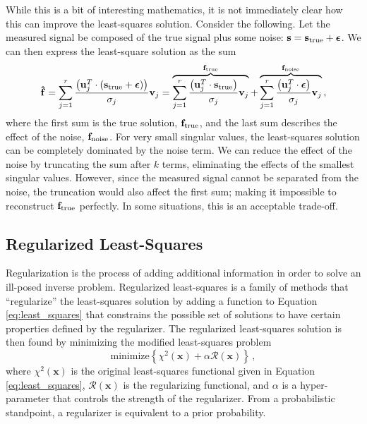 While this is a bit of interesting mathematics, it is not immediately clear how this can improve the least-squares solution. Consider the following. Let the measured signal be composed of the true signal plus some noise: $\mathbf{s} = \mathbf{s}_{\rm{true}} + \boldsymbol{\epsilon}$. We can then express the least-square solution as the sum
\begin{equation}\label{eq:f_svd_sum}
    \mathbf{\hat{f}} = \sum_{j=1}^r \frac{\left(\mathbf{u}_j^T \cdot (\mathbf{s}_{\rm{true}} + \boldsymbol{\epsilon}) \right)}{\sigma_j} \mathbf{v}_j = \overbrace{\sum_{j=1}^r \frac{\left(\mathbf{u}_j^T \cdot \mathbf{s}_{\rm{true}} \right)}{\sigma_j} \mathbf{v}_j}^{\mathbf{f}_{\rm{true}}} + \overbrace{\sum_{j=1}^r \frac{\left(\mathbf{u}_j^T \cdot \boldsymbol{\epsilon} \right)}{\sigma_j} \mathbf{v}_j}^{\mathbf{f}_{\rm{noise}}}\,,
\end{equation}
where the first sum is the true solution, $\mathbf{f}_{\rm{true}}$, and the last sum describes the effect of the noise, $\mathbf{f}_{\rm{noise}}$. For very small singular values, the least-squares solution can be completely dominated by the noise term. We can reduce the effect of the noise by truncating the sum after $k$ terms, eliminating the effects of the smallest singular values. However, since the measured signal cannot be separated from the noise, the truncation would also affect the first sum; making it impossible to reconstruct $\mathbf{f}_{\rm{true}}$ perfectly. In some situations, this is an acceptable trade-off. 

\subsection{Regularized Least-Squares}
Regularization is the process of adding additional information in order to solve an ill-posed inverse problem. Regularized least-squares is a family of methods that ``regularize'' the least-squares solution by adding a function to Equation \ref{eq:least_squares} that constrains the possible set of solutions to have certain properties defined by the regularizer. The regularized least-squares solution is then found by minimizing the modified least-squares problem
\begin{equation}\label{eq:regularized_least_squares}
    \mathrm{minimize} \left \lbrace \chi^2(\mathbf{x}) + \alpha \mathcal{R}(\mathbf{x}) \right \rbrace \,,
\end{equation}
where $\chi^2(\mathbf{x})$ is the original least-squares functional given in Equation \ref{eq:least_squares}, $\mathcal{R}(\mathbf{x})$ is the regularizing functional, and $\alpha$ is a hyper-parameter that controls the strength of the regularizer. From a probabilistic standpoint, a regularizer is equivalent to a prior probability. 

